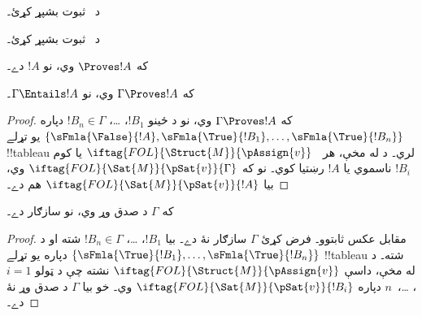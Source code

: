 \documentclass[../../../include/open-logic-section]{subfiles}
\begin{document}
\begin{prob}
د~ ثبوت بشپړ کړئ۔
\end{prob}
\tagendprob

\begin{prob}
د~ ثبوت بشپړ کړئ۔
\end{prob}
\tagendprob

\begin{cor}
که $\Proves !A$ وي، نو $!A$  دے۔
\end{cor}

\begin{cor}
که $\Gamma \Proves !A$ وي، نو $\Gamma \Entails !A$۔
\end{cor}

\begin{proof}
  که $\Gamma \Proves !A$ وي، نو د ځينو
  $!B_1$، \dots، $!B_n \in \Gamma$ دپاره
  $\{\sFmla{\False}{!A}, \sFmla{\True}{!B_1}, \dots,
  \sFmla{\True}{!B_n}\}$ يو تړلے !!{tableau} لري۔ د
   له مخې، هر
  ~$\iftag{FOL}{\Struct{M}}{\pAssign{v}}$
  يا کوم $!B_i$ ناسموي يا $!A$ رښتيا کوي۔ نو که
  $\iftag{FOL}{\Sat{M}}{\pSat{v}}{\Gamma}$ وي، بيا
  $\iftag{FOL}{\Sat{M}}{\pSat{v}}{!A}$ هم دے۔
\end{proof}

\begin{cor}
که $\Gamma$ د صدق وړ وي، نو سازګار دے۔
\end{cor}

\begin{proof}
مقابل عکس ثابتوو۔ فرض کړئ $\Gamma$ سازګار نۀ دے۔ بيا
$!B_1$، \dots، $!B_n \in \Gamma$ شته او د
$\{\sFmla{\True}{!B_1}, \dots, \sFmla{\True}{!B_n}\}$ دپاره يو
تړلے !!{tableau} شته۔ د  له مخې، داسې
$\iftag{FOL}{\Struct{M}}{\pAssign{v}}$ نشته چې د ټولو
$i=1$، \dots،~$n$ دپاره $\iftag{FOL}{\Sat{M}}{\pSat{v}}{!B_i}$ وي۔
خو بيا $\Gamma$ د صدق وړ نۀ دے۔
\end{proof}
\end{document}
